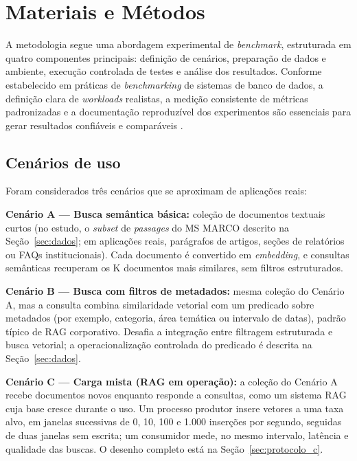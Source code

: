 
\section{Materiais e Métodos}

A metodologia segue uma abordagem experimental de \textit{benchmark}, estruturada em quatro componentes principais: definição de cenários, preparação de dados e ambiente, execução controlada de testes e análise dos resultados. Conforme estabelecido em práticas de \textit{benchmarking} de sistemas de banco de dados, a definição clara de \textit{workloads} realistas, a medição consistente de métricas padronizadas e a documentação reproduzível dos experimentos são essenciais para gerar resultados confiáveis e comparáveis \cite{aerospike2025}.

\subsection{Cenários de uso}

Foram considerados três cenários que se aproximam de aplicações reais:

\textbf{Cenário A --- Busca semântica básica:} coleção de documentos textuais curtos (no estudo, o \textit{subset} de \textit{passages} do MS MARCO descrito na Seção~\ref{sec:dados}; em aplicações reais, parágrafos de artigos, seções de relatórios ou FAQs institucionais). Cada documento é convertido em \textit{embedding}, e consultas semânticas recuperam os K documentos mais similares, sem filtros estruturados.

\textbf{Cenário B --- Busca com filtros de metadados:} mesma coleção do Cenário A, mas a consulta combina similaridade vetorial com um predicado sobre metadados (por exemplo, categoria, área temática ou intervalo de datas), padrão típico de RAG corporativo. Desafia a integração entre filtragem estruturada e busca vetorial; a operacionalização controlada do predicado é descrita na Seção~\ref{sec:dados}.

\textbf{Cenário C --- Carga mista (RAG em operação):} a coleção do Cenário A recebe documentos novos enquanto responde a consultas, como um sistema RAG cuja base cresce durante o uso. Um processo produtor insere vetores a uma taxa alvo, em janelas sucessivas de 0, 10, 100 e 1.000 inserções por segundo, seguidas de duas janelas sem escrita; um consumidor mede, no mesmo intervalo, latência e qualidade das buscas. O desenho completo está na Seção~\ref{sec:protocolo_c}.

